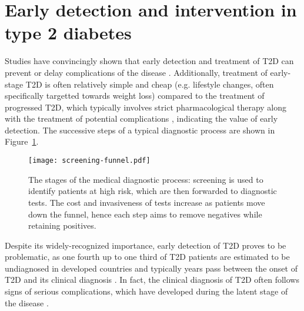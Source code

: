 \section{Early detection and intervention in type 2 diabetes} \label{intro:screening}
Studies have convincingly shown that early detection and treatment of T2D can prevent or delay complications of the disease \citep{haffner1990cardiovascular,engelgau2000screening, diabetes2002reduction, genuth2003implications, holman200810, gaede2008effect, echouffo2011screening}. Additionally, treatment of early-stage T2D is often relatively simple and cheap (e.g. lifestyle changes, often specifically targetted towards weight loss) compared to the treatment of progressed T2D, which typically involves strict pharmacological therapy along with the treatment of potential complications \citep{pan1997effects,tuomilehto2001prevention,diabetes2002reduction,zammitt2005hypoglycemia}, indicating the value of early detection. The successive steps of a typical diagnostic process are shown in Figure~\ref{intro:screening-funnel}.

\begin{figure}[!h]
  \centering
  \texttt{[image: screening-funnel.pdf]}
  \caption{The stages of the medical diagnostic process: screening is used to identify patients at high risk, which are then forwarded to diagnostic tests. The cost and invasiveness of tests increase as patients move down the funnel, hence each step aims to remove negatives while retaining positives. } 
  \label{intro:screening-funnel}
\end{figure}

Despite its widely-recognized importance, early detection of T2D proves to be problematic, as one fourth up to one third of T2D patients are estimated to be undiagnosed in developed countries \citep{diabetesliga, beagley2014global, american2014standards} and typically years pass between the onset of T2D and its clinical diagnosis \citep{harris1992onset}. In fact, the clinical diagnosis of T2D often follows signs of serious complications, which have developed during the latent stage of the disease \citep{rajala1998prevalence,harris2000early, hu2002elevated, american2014standards}. 

